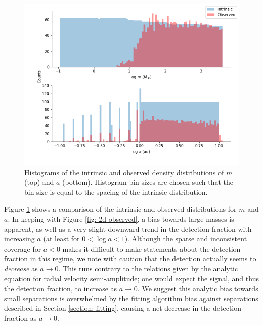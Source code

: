 \documentclass[12pt,manuscript]{aastex}
\begin{document}
\begin{figure}[ht]
  \centering
  \includegraphics[width=0.9\linewidth]{../figures/planets3_comparison}
  \caption{Histograms of the intrinsic and observed density distributions of $m$ (top) and $a$ (bottom). Histogram bin sizes are chosen such that the bin size is equal to the spacing of the intrinsic distribution.}
  \label{fig: comparison hist}
\end{figure}

Figure \ref{fig: comparison hist} shows a comparison of the intrinsic and observed distributions for $m$ and $a$.
In keeping with Figure \ref{fig: 2d observed}, a bias towards large masses is apparent, as well as a very slight downward trend in the detection fraction with increasing $a$ (at least for $0 < \log a < 1$).
Although the sparse and inconsistent coverage for $a < 0$ makes it difficult to make statements about the detection fraction in this regime, we note with caution that the detection actually seems to \textit{decrease} as $a\to 0$.
This runs contrary to the relations given by the analytic equation for radial velocity semi-amplitude; one would expect the signal, and thus the detection fraction, to increase as $a \to 0$.
We suggest this analytic bias towards small separations is overwhelmed by the fitting algorithm bias against separations described in Section \ref{section: fitting}, causing a net decrease in the detection fraction as  $a \to 0$.
\end{document}
